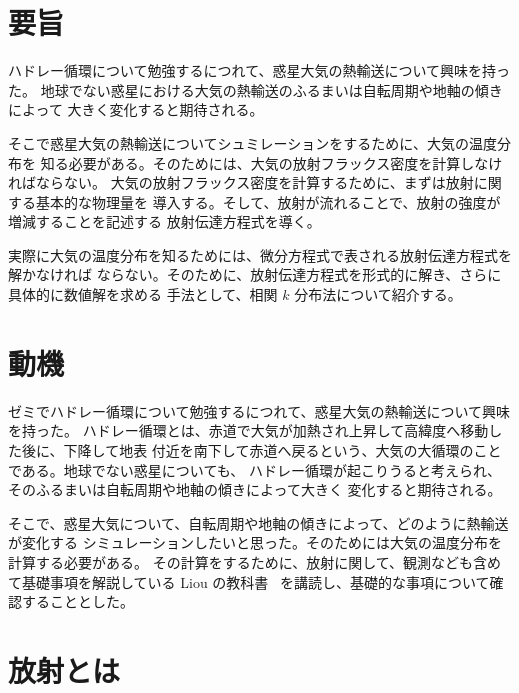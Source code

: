 \documentclass[article,twoside]{dennou777}
\renewcommand{\maketitle}{\epmaketitle}
\begin{document}
\begin{titlepage}
	\maketitle
\end{titlepage}

\cleardoublepage

\rule{0pt}{0pt}\vfill
\section*{要旨}
ハドレー循環について勉強するにつれて、惑星大気の熱輸送について興味を持った。
地球でない惑星における大気の熱輸送のふるまいは自転周期や地軸の傾きによって
大きく変化すると期待される。

そこで惑星大気の熱輸送についてシュミレーションをするために、大気の温度分布を
知る必要がある。そのためには、大気の放射フラックス密度を計算しなければならない。
大気の放射フラックス密度を計算するために、まずは放射に関する基本的な物理量を
導入する。そして、放射が流れることで、放射の強度が増減することを記述する
放射伝達方程式を導く。

実際に大気の温度分布を知るためには、微分方程式で表される放射伝達方程式を解かなければ
ならない。そのために、放射伝達方程式を形式的に解き、さらに具体的に数値解を求める
手法として、相関 $k$ 分布法について紹介する。
\vfill\rule{0pt}{0pt}

\pagebreak

\tableofcontents
\pagebreak

\section{動機}

ゼミでハドレー循環について勉強するにつれて、惑星大気の熱輸送について興味を持った。
ハドレー循環とは、赤道で大気が加熱され上昇して高緯度へ移動した後に、下降して地表
付近を南下して赤道へ戻るという、大気の大循環のことである。地球でない惑星についても、
ハドレー循環が起こりうると考えられ、そのふるまいは自転周期や地軸の傾きによって大きく
変化すると期待される。

そこで、惑星大気について、自転周期や地軸の傾きによって、どのように熱輸送が変化する
シミュレーションしたいと思った。そのためには大気の温度分布を計算する必要がある。
その計算をするために、放射に関して、観測なども含めて基礎事項を解説している Liou
の教科書~\cite{liou} を講読し、基礎的な事項について確認することとした。

\section{放射とは}
\end{document}
